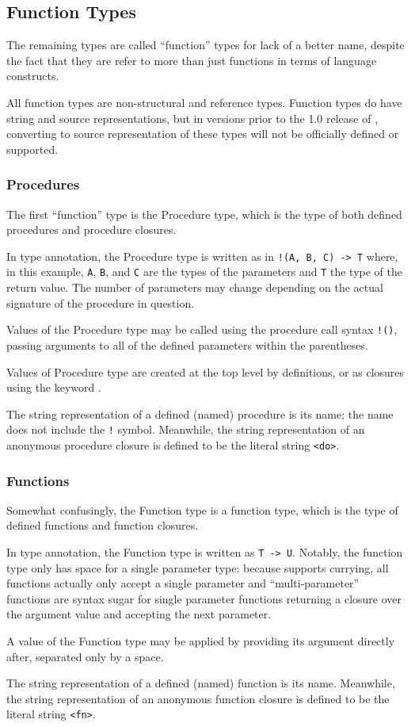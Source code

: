 \subsection{Function Types}

The remaining types are called ``function'' types for lack of a better name,
despite the fact that they are refer to more than just functions in terms of
language constructs.

All function types are non-structural and reference types. Function types do
have string and source representations, but in versions prior to the 1.0
release of \Trilogy{}, converting to source representation of these types will
not be officially defined or supported.

\subsubsection{Procedures}

The first ``function'' type is the Procedure type, which is the type of both
defined procedures and procedure closures.

In type annotation, the Procedure type is written as in \texttt{!(A, B, C) -> T}
where, in this example, \texttt{A}, \texttt{B}, and \texttt{C} are the types of
the parameters and \texttt{T} the type of the return value. The number of parameters
may change depending on the actual signature of the procedure in question.

Values of the Procedure type may be called using the procedure call syntax \texttt{!()},
passing arguments to all of the defined parameters within the parentheses.

Values of Procedure type are created at the top level by  definitions, or as
closures using the keyword .

The string representation of a defined (named) procedure is its name; the name does
not include the \texttt{!} symbol. Meanwhile, the string representation of an anonymous
procedure closure is defined to be the literal string \texttt{<do>}.

\subsubsection{Functions}

Somewhat confusingly, the Function type is a function type, which is the type of
defined functions and function closures.

In type annotation, the Function type is written as \texttt{T -> U}. Notably, the
function type only has space for a single parameter type: because \Poetry{} supports
currying, all functions actually only accept a single parameter and ``multi-parameter''
functions are syntax sugar for single parameter functions returning a closure over
the argument value and accepting the next parameter.

A value of the Function type may be applied by providing its argument directly after,
separated only by a space.

The string representation of a defined (named) function is its name. Meanwhile, the
string representation of an anonymous function closure is defined to be the literal
string \texttt{<fn>}.
